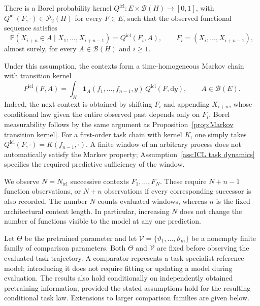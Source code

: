 \begin{assumption}
\label{ass:ICL task dynamics}
There is a Borel probability kernel \(Q^{\mathrm{icl}}:E\times\mathcal B(H)\to[0,1]\), with \(Q^{\mathrm{icl}}(F,\cdot)\in\mathcal P_2(H)\) for every \(F\in E\), such that the observed functional sequence satisfies
\[
\mathbb P(X_{i+n}\in A\mid X_1,\ldots,X_{i+n-1})
=Q^{\mathrm{icl}}(F_i,A),
\qquad F_i=(X_i,\ldots,X_{i+n-1}),
\]
almost surely, for every \(A\in\mathcal B(H)\) and \(i\geqslant1\).
\end{assumption}

Under this assumption, the contexts form a time-homogeneous Markov chain with transition kernel
\begin{equation}
\label{eq:ICL task context kernel}
P^{\mathrm{icl}}(F,A)
=\int_H\mathbf1_A(f_1,\ldots,f_{n-1},y)\,
Q^{\mathrm{icl}}(F,\mathrm dy),
\qquad A\in\mathcal B(E).
\end{equation}
Indeed, the next context is obtained by shifting \(F_i\) and appending \(X_{i+n}\), whose conditional law given the entire observed past depends only on \(F_i\). Borel measurability follows by the same argument as Proposition~\ref{prop:Markov transition kernel}. For a first-order task chain with kernel \(K\), one simply takes \(Q^{\mathrm{icl}}(F,\cdot)=K(f_{n-1},\cdot)\). A finite window of an arbitrary process does not automatically satisfy the Markov property; Assumption~\ref{ass:ICL task dynamics} specifies the required predictive sufficiency of the window.

We observe \(N=N_{\mathrm{icl}}\) successive contexts \(F_1,\ldots,F_N\). These require \(N+n-1\) function observations, or \(N+n\) observations if every corresponding successor is also recorded. The number \(N\) counts evaluated windows, whereas \(n\) is the fixed architectural context length. In particular, increasing \(N\) does not change the number of functions visible to the model at any one prediction.

Let \(\Theta\) be the pretrained parameter and let \(\mathcal V=\{\vartheta_1,\ldots,\vartheta_m\}\) be a nonempty finite family of comparison parameters. Both \(\Theta\) and \(\mathcal V\) are fixed before observing the evaluated task trajectory. A comparator represents a task-specialist reference model; introducing it does not require fitting or updating a model during evaluation. The results also hold conditionally on independently obtained pretraining information, provided the stated assumptions hold for the resulting conditional task law. Extensions to larger comparison families are given below.

